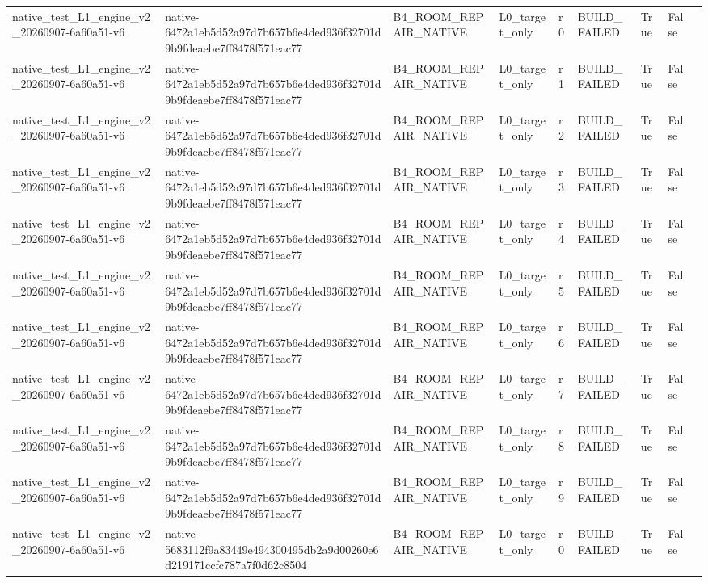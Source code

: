 \begin{tabular}{lllllllll}
native\_test\_L1\_engine\_v2\_20260907-6a60a51-v6 & native-6472a1eb5d52a97d7b657b6e4ded936f32701d9b9fdeaebe7ff8478f571eac77 & B4\_ROOM\_REPAIR\_NATIVE & L0\_target\_only & r0 & BUILD\_FAILED & True & False &  \\
native\_test\_L1\_engine\_v2\_20260907-6a60a51-v6 & native-6472a1eb5d52a97d7b657b6e4ded936f32701d9b9fdeaebe7ff8478f571eac77 & B4\_ROOM\_REPAIR\_NATIVE & L0\_target\_only & r1 & BUILD\_FAILED & True & False &  \\
native\_test\_L1\_engine\_v2\_20260907-6a60a51-v6 & native-6472a1eb5d52a97d7b657b6e4ded936f32701d9b9fdeaebe7ff8478f571eac77 & B4\_ROOM\_REPAIR\_NATIVE & L0\_target\_only & r2 & BUILD\_FAILED & True & False &  \\
native\_test\_L1\_engine\_v2\_20260907-6a60a51-v6 & native-6472a1eb5d52a97d7b657b6e4ded936f32701d9b9fdeaebe7ff8478f571eac77 & B4\_ROOM\_REPAIR\_NATIVE & L0\_target\_only & r3 & BUILD\_FAILED & True & False &  \\
native\_test\_L1\_engine\_v2\_20260907-6a60a51-v6 & native-6472a1eb5d52a97d7b657b6e4ded936f32701d9b9fdeaebe7ff8478f571eac77 & B4\_ROOM\_REPAIR\_NATIVE & L0\_target\_only & r4 & BUILD\_FAILED & True & False &  \\
native\_test\_L1\_engine\_v2\_20260907-6a60a51-v6 & native-6472a1eb5d52a97d7b657b6e4ded936f32701d9b9fdeaebe7ff8478f571eac77 & B4\_ROOM\_REPAIR\_NATIVE & L0\_target\_only & r5 & BUILD\_FAILED & True & False &  \\
native\_test\_L1\_engine\_v2\_20260907-6a60a51-v6 & native-6472a1eb5d52a97d7b657b6e4ded936f32701d9b9fdeaebe7ff8478f571eac77 & B4\_ROOM\_REPAIR\_NATIVE & L0\_target\_only & r6 & BUILD\_FAILED & True & False &  \\
native\_test\_L1\_engine\_v2\_20260907-6a60a51-v6 & native-6472a1eb5d52a97d7b657b6e4ded936f32701d9b9fdeaebe7ff8478f571eac77 & B4\_ROOM\_REPAIR\_NATIVE & L0\_target\_only & r7 & BUILD\_FAILED & True & False &  \\
native\_test\_L1\_engine\_v2\_20260907-6a60a51-v6 & native-6472a1eb5d52a97d7b657b6e4ded936f32701d9b9fdeaebe7ff8478f571eac77 & B4\_ROOM\_REPAIR\_NATIVE & L0\_target\_only & r8 & BUILD\_FAILED & True & False &  \\
native\_test\_L1\_engine\_v2\_20260907-6a60a51-v6 & native-6472a1eb5d52a97d7b657b6e4ded936f32701d9b9fdeaebe7ff8478f571eac77 & B4\_ROOM\_REPAIR\_NATIVE & L0\_target\_only & r9 & BUILD\_FAILED & True & False &  \\
native\_test\_L1\_engine\_v2\_20260907-6a60a51-v6 & native-5683112f9a83449e494300495db2a9d00260e6d219171ccfc787a7f0d62c8504 & B4\_ROOM\_REPAIR\_NATIVE & L0\_target\_only & r0 & BUILD\_FAILED & True & False &  \\

\end{tabular}

